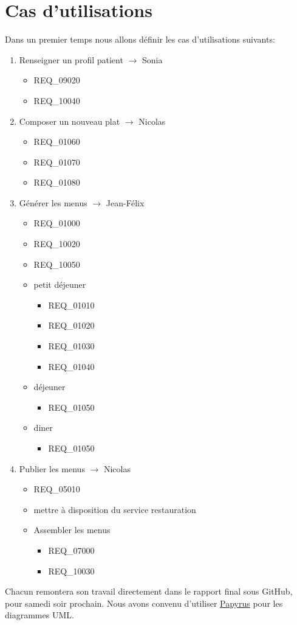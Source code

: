 \documentclass[11pt,a4paper,french,twoside,openright]{article}
\begin{document}
\section{Cas d'utilisations}
Dans un premier temps nous allons définir les cas d'utilisations suivants:
\begin{enumerate}
\item Renseigner un profil patient $\rightarrow$ Sonia
  \begin{itemize}
   \item REQ\_09020
   \item REQ\_10040
  \end{itemize}
\item Composer un nouveau plat $\rightarrow$ Nicolas
  \begin{itemize}
   \item REQ\_01060
   \item REQ\_01070
   \item REQ\_01080
  \end{itemize}
\item Générer les menus $\rightarrow$ Jean-Félix
  \begin{itemize}
   \item REQ\_01000
   \item REQ\_10020
   \item REQ\_10050
   \item petit déjeuner
   \begin{itemize}
     \item REQ\_01010
     \item REQ\_01020
     \item REQ\_01030
     \item REQ\_01040
   \end{itemize}
   \item déjeuner
   \begin{itemize}
     \item REQ\_01050
   \end{itemize}
   \item diner
   \begin{itemize}
     \item REQ\_01050
   \end{itemize}
  \end{itemize}
\item Publier les menus $\rightarrow$ Nicolas
  \begin{itemize}
   \item REQ\_05010
   \item mettre à disposition du service restauration
   \item Assembler les menus
   \begin{itemize}
     \item REQ\_07000
     \item REQ\_10030
   \end{itemize}
  \end{itemize}
\end{enumerate}
Chacun remontera son travail directement dans le rapport final sous GitHub, pour samedi soir prochain.
Nous avons convenu d'utiliser \href{https://eclipse.org/papyrus/}{Papyrus} pour les diagrammes UML.
\end{document}
